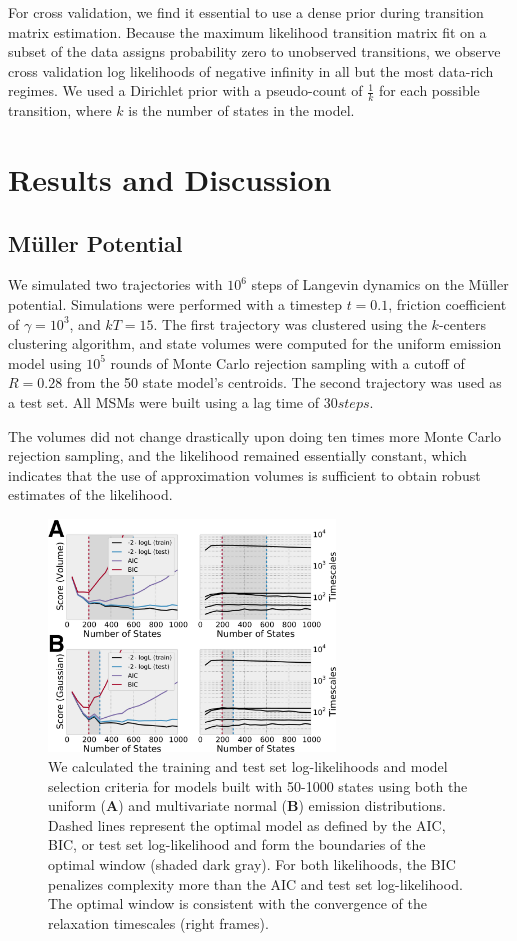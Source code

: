 \documentclass[journal=jpcbfk, layout=traditional, manuscript=article]{achemso}
\begin{document}
For cross validation, we find it essential to use a dense prior during transition matrix estimation. Because the maximum likelihood transition matrix fit on a subset of the data assigns probability zero to unobserved transitions, we observe cross validation log likelihoods of negative infinity in all but the most data-rich regimes. We used a Dirichlet prior with a pseudo-count of $\frac{1}{k}$ for each possible transition, where $k$ is the number of states in the model.

\section{Results and Discussion}
\subsection{M\"{u}ller Potential}
We simulated two trajectories with $10^6$ steps of Langevin dynamics on the M\"{u}ller potential\cite{Muller1980Reaction}. Simulations were performed with a timestep $t=0.1$, friction coefficient of $\gamma=10^3$, and $kT=15$. The first trajectory was clustered using the $k$-centers clustering algorithm, and state volumes were computed for the uniform emission model using $10^5$ rounds of Monte Carlo rejection sampling with a cutoff of $R=0.28$ from the 50 state model's centroids. The second trajectory was used as a test set. All MSMs were built using a lag time of $30 steps$.

The volumes did not change drastically upon doing ten times more Monte Carlo rejection sampling, and the likelihood remained essentially constant, which indicates that the use of approximation volumes is sufficient to obtain robust estimates of the likelihood. 

\begin{figure}[h]
\centering
\includegraphics[width=3in]{figs_final/mull_likes.png}
\caption{We calculated the training and test set log-likelihoods and model selection criteria for models built with 50-1000 states using both the uniform ({\bf A}) and multivariate normal ({\bf B}) emission distributions. Dashed lines represent the optimal model as defined by the AIC, BIC, or test set log-likelihood and form the boundaries of the optimal window (shaded dark gray). For both likelihoods, the BIC penalizes complexity more than the AIC and test set log-likelihood. The optimal window is consistent with the convergence of the relaxation timescales (right frames).}
\label{fig:mullerlike}
\end{figure}
\end{document}
